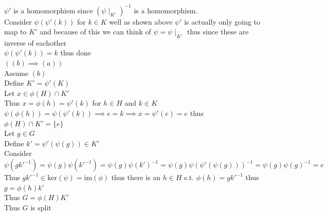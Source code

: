 \documentclass[12pt, letterpaper]{article}
\theoremstyle{definition}
\renewcommand{\t}[1]{\text{#1}}
\begin{document}
$\psi'$ is a homomorphism since $(\psi\mid_{K'})^{-1}$ is a homomorphism.\\
Consider $\psi(\psi'(k))$ for $k \in K$ well as shown above $\psi'$ is actually only going to map to $K'$ and because of this we can think of $\psi=\psi\mid_{K'}$ thus since these are inverse of eachother\\
$\psi(\psi'(k))=k$ thus done\\
$((b)\implies (a))$\\
Assume $(b)$\\
Define $K' = \psi'(K)$\\
Let $x \in \phi(H) \cap K'$\\
Thus $x=\phi(h)=\psi'(k)$ for $h \in H$ and $k \in K$\\
$\psi(\phi(h))=\psi(\psi'(k)) \implies e=k \implies x=\psi'(e)=e$ thus $\phi(H) \cap K'=\{e\}$\\
Let $g \in G$\\
Define $k'=\psi'(\psi(g)) \in K'$\\
Consider $\psi(gk'^{-1})=\psi(g)\psi(k'^{-1})=\psi(g)\psi(k')^{-1}=\psi(g)\psi(\psi'(\psi(g)))^{-1}=\psi(g)\psi(g)^{-1}=e$\\
Thus $gk'^{-1} \in \t{ker}(\psi)=\t{im}(\phi)$ thus there is an $h \in H$ s.t. $\phi(h)=gk'^{-1}$ thus $g=\phi(h)k'$\\
Thus $G=\phi(H)K'$\\
Thus $G$ is split

\newpage
\end{document}
